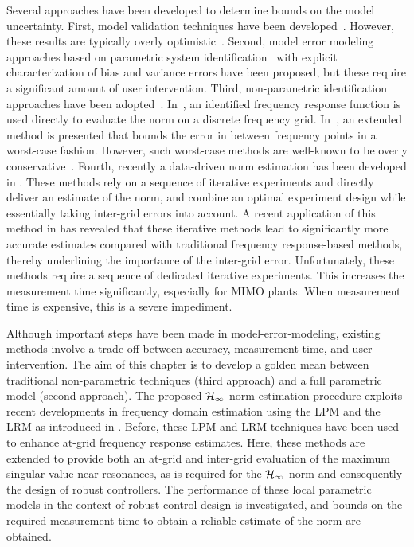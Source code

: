 Several approaches have been developed to determine bounds on the model uncertainty. 
First, model validation techniques have been developed~\citep[see e.g.][]{Smith1992,Xu1999}.
However, these results are typically overly optimistic~\citep{Oomen2009UncEstim}.
Second, model error modeling approaches based on parametric system identification~\citep{Ljung1999MEM} with explicit characterization of bias and variance errors have been proposed, but these require a significant amount of user intervention.
Third, non-parametric identification approaches have been adopted~\citep[][see e.g.]{vandeWal2002,deVries1994}. 
In~\citet{vandeWal2002}, an identified frequency response function is used directly to evaluate the \Hinf{} norm on a discrete frequency grid. 
In~\citet{deVries1994}, an extended method is presented that bounds the error in between frequency points in a worst-case fashion. 
However, such worst-case methods are well-known to be overly conservative~\citep[Section 9.5.2]{Vinnicombe2001}. 
Fourth, recently a data-driven \Hinf{} norm estimation has been developed in \citet{Wahlberg2010,Oomen2014ILH}.
These methods rely on a sequence of iterative experiments and directly deliver an estimate of the \Hinf{} norm, and combine an optimal experiment design while essentially taking inter-grid errors into account.
A recent application of this method in \citet{Oomen2014ILH} has revealed that these iterative methods lead to significantly more accurate \Hinf{} estimates compared with traditional frequency response-based methods, thereby underlining the importance of the inter-grid error.
Unfortunately, these methods require a sequence of dedicated iterative experiments.
This increases the measurement time significantly, especially for \gls{MIMO} plants.
When measurement time is expensive, this is a severe impediment.

Although important steps have been made in model-error-modeling, existing methods involve a trade-off between accuracy, measurement time, and user intervention.
The aim of this chapter is to develop a golden mean between traditional non-parametric techniques (third approach) and a full parametric model (second approach).
The proposed $\mathcal{H}_{\infty}{}$ norm estimation procedure exploits recent developments in frequency domain estimation using the \gls{LPM} \citep{Schoukens2009LPM} and the \gls{LRM} \citep{McKelvey2012LRM} as introduced in \citet{Geerardyn2014IFAC,Geerardyn2014ISMA}.
Before, these \gls{LPM} and \gls{LRM} techniques have been used to enhance at-grid frequency response estimates.
Here, these methods are extended to provide both an at-grid and inter-grid evaluation of the maximum singular value near resonances, as is required for the $\mathcal{H}_{\infty}{}$ norm and consequently the design of robust controllers.
The performance of these local parametric models in the context of robust control design is investigated, and bounds on the required measurement time to obtain a reliable estimate of the \Hinf{} norm are obtained.

